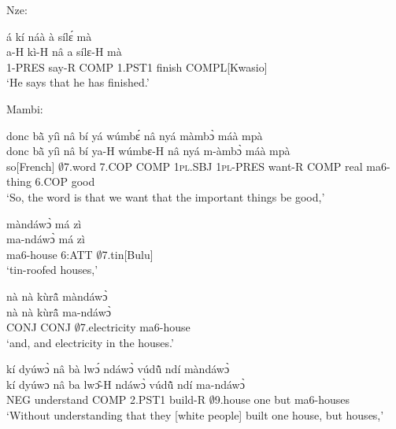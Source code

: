\noindent Nze:

\begin{exe} 
\exC\label{185} 
  \glll á kí náà à sílɛ́ mà \\
        a-H kì-H nâ a sílɛ-H mà \\
         1-PRES say-R COMP 1.PST1 finish COMPL[Kwasio] \\
    \trans `He says that he has finished.'
\end{exe}

\noindent Mambi:

\begin{exe} 
\exC\label{186}
  \glll donc bã̀ yíì nâ bí yá wúmbɛ́ nâ nyá màmbɔ̀ máà mpà \\
      donc bã̀ yíì nâ bí ya-H wúmbɛ-H nâ nyá m-àmbɔ̀ máà mpà \\
        so[French] $\emptyset$7.word 7.COP COMP 1\textsc{pl}.SBJ 1\textsc{pl}-PRES want-R COMP real ma6-thing 6.COP good  \\
    \trans `So, the word is that we want that the important things be good,'
\end{exe}

\begin{exe} 
\exC\label{187}
  \glll màndáwɔ̀ má zì \\
       ma-ndáwɔ̀ má zì \\
        ma6-house 6:ATT $\emptyset$7.tin[Bulu]  \\
    \trans `tin-roofed houses,'
\end{exe}

\begin{exe} 
\exC\label{188}
  \glll nà nà kùrã̂ màndáwɔ̀ \\
       nà nà kùrã̂ ma-ndáwɔ̀ \\
        CONJ CONJ $\emptyset$7.electricity ma6-house  \\
    \trans `and, and electricity in the houses.'
\end{exe}

\begin{exe} 
\exC\label{189}
  \glll kí dyúwɔ̀ nâ bà lwɔ́ ndáwɔ̀ vúdũ̂ ndí màndáwɔ̀ \\
        kí dyúwɔ nâ ba lwɔ̂-H ndáwɔ̀ vúdũ̂ ndí ma-ndáwɔ̀ \\
         NEG understand COMP 2.PST1 build-R $\emptyset$9.house one but ma6-houses \\
    \trans `Without understanding that they [white people] built one house, but houses,'
\end{exe}

